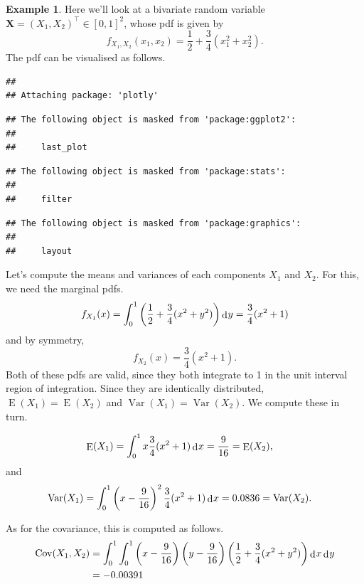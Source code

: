 \documentclass[
]{book}
\newcommand{\bX}{{\boldsymbol X}}
\DeclareMathOperator{\E}{E}
\DeclareMathOperator{\Var}{Var}
\DeclareMathOperator{\Cov}{Cov}
\DeclareMathOperator{\dd}{d}
\newcommand{\dint}{\dd\hspace{0.5pt}\!}
\theoremstyle{definition}
\theoremstyle{definition}
\newtheorem{example}{Example}[chapter]
\theoremstyle{definition}
\theoremstyle{definition}
\theoremstyle{remark}
\begin{document}
\begin{example}
Here we'll look at a bivariate random variable \(\bX=(X_1,X_2)^\top\in[0,1]^2\), whose pdf is given by
\[
f_{X_1,X_2}(x_1,x_2) = \frac{1}{2} + \frac{3}{4}(x_1^2 + x_2^2).
\]
The pdf can be visualised as follows.

\begin{verbatim}
## 
## Attaching package: 'plotly'
\end{verbatim}

\begin{verbatim}
## The following object is masked from 'package:ggplot2':
## 
##     last_plot
\end{verbatim}

\begin{verbatim}
## The following object is masked from 'package:stats':
## 
##     filter
\end{verbatim}

\begin{verbatim}
## The following object is masked from 'package:graphics':
## 
##     layout
\end{verbatim}

Let's compute the means and variances of each components \(X_1\) and \(X_2\). For this, we need the marginal pdfs.
\[
f_{X_1}(x) = \int_{0}^1 \left(\frac{1}{2} + \frac{3}{4}(x^2 + y^2) \right) \dint y = \frac{3}{4}(x^2 + 1)
\]
and by symmetry,
\[
f_{X_2}(x) = \frac{3}{4}(x^2 + 1).
\]
Both of these pdfs are valid, since they both integrate to 1 in the unit interval region of integration.
Since they are identically distributed, \(\E(X_1)=\E(X_2)\) and \(\Var(X_1)=\Var(X_2)\).
We compute these in turn.

\begin{align*}
\E(X_1) &= \int_0^1 x\frac{3}{4}(x^2 + 1) \dint x = \frac{9}{16} = \E(X_2),
\end{align*}
and
\begin{align*}
\Var(X_1) &= \int_0^1 \left(x - \frac{9}{16}\right)^2 \frac{3}{4}(x^2 + 1) \dint x = 0.0836 = \Var(X_2).
\end{align*}

As for the covariance, this is computed as follows.
\begin{align*}
\Cov(X_1,X_2) &= \int_0^1 \int_0^1 \left(x - \frac{9}{16}\right)\left(y - \frac{9}{16}\right) \left( \frac{1}{2} + \frac{3}{4}(x^2 + y^2) \right) \dint x \dint y \\
&= -0.00391
\end{align*}


\end{example}
\end{document}
